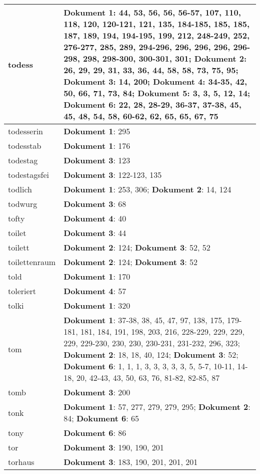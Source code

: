 \documentclass[a5paper]{article}
\begin{document}
\begin{longtable}[l]{|l|p{3in}|}
\hline
todess & \textbf{Dokument 1}: 44, 53, 56, 56, 56-57, 107, 110, 118, 120, 120-121, 121, 135, 184-185, 185, 185, 187, 189, 194, 194-195, 199, 212, 248-249, 252, 276-277, 285, 289, 294-296, 296, 296, 296, 296-298, 298, 298-300, 300-301, 301; \textbf{Dokument 2}: 26, 29, 29, 31, 33, 36, 44, 58, 58, 73, 75, 95; \textbf{Dokument 3}: 14, 200; \textbf{Dokument 4}: 34-35, 42, 50, 66, 71, 73, 84; \textbf{Dokument 5}: 3, 3, 5, 12, 14; \textbf{Dokument 6}: 22, 28, 28-29, 36-37, 37-38, 45, 45, 48, 54, 58, 60-62, 62, 65, 65, 67, 75 \\
\hline
todesserin & \textbf{Dokument 1}: 295 \\
\hline
todesstab & \textbf{Dokument 1}: 176 \\
\hline
todestag & \textbf{Dokument 3}: 123 \\
\hline
todestagsfei & \textbf{Dokument 3}: 122-123, 135 \\
\hline
todlich & \textbf{Dokument 1}: 253, 306; \textbf{Dokument 2}: 14, 124 \\
\hline
todwurg & \textbf{Dokument 3}: 68 \\
\hline
tofty & \textbf{Dokument 4}: 40 \\
\hline
toilet & \textbf{Dokument 3}: 44 \\
\hline
toilett & \textbf{Dokument 2}: 124; \textbf{Dokument 3}: 52, 52 \\
\hline
toilettenraum & \textbf{Dokument 2}: 124; \textbf{Dokument 3}: 52 \\
\hline
told & \textbf{Dokument 1}: 170 \\
\hline
toleriert & \textbf{Dokument 4}: 57 \\
\hline
tolki & \textbf{Dokument 1}: 320 \\
\hline
tom & \textbf{Dokument 1}: 37-38, 38, 45, 47, 97, 138, 175, 179-181, 181, 184, 191, 198, 203, 216, 228-229, 229, 229, 229, 229-230, 230, 230, 230-231, 231-232, 296, 323; \textbf{Dokument 2}: 18, 18, 40, 124; \textbf{Dokument 3}: 52; \textbf{Dokument 6}: 1, 1, 1, 3, 3, 3, 3, 3, 5, 5-7, 10-11, 14-18, 20, 42-43, 43, 50, 63, 76, 81-82, 82-85, 87 \\
\hline
tomb & \textbf{Dokument 3}: 200 \\
\hline
tonk & \textbf{Dokument 1}: 57, 277, 279, 279, 295; \textbf{Dokument 2}: 84; \textbf{Dokument 6}: 65 \\
\hline
tony & \textbf{Dokument 6}: 86 \\
\hline
tor & \textbf{Dokument 3}: 190, 190, 201 \\
\hline
torhaus & \textbf{Dokument 3}: 183, 190, 201, 201, 201 \\

\end{longtable}
\end{document}
